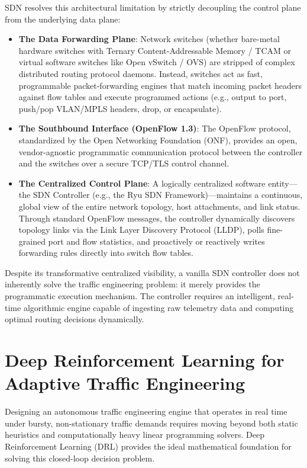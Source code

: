 SDN resolves this architectural limitation by strictly decoupling the control plane from the underlying data plane:
\begin{itemize}
    \item \textbf{The Data Forwarding Plane}: Network switches (whether bare-metal hardware switches with Ternary Content-Addressable Memory / TCAM or virtual software switches like Open vSwitch / OVS) are stripped of complex distributed routing protocol daemons. Instead, switches act as fast, programmable packet-forwarding engines that match incoming packet headers against flow tables and execute programmed actions (e.g., output to port, push/pop VLAN/MPLS headers, drop, or encapsulate).
    \item \textbf{The Southbound Interface (OpenFlow 1.3)}: The OpenFlow protocol, standardized by the Open Networking Foundation (ONF), provides an open, vendor-agnostic programmatic communication protocol between the controller and the switches over a secure TCP/TLS control channel.
    \item \textbf{The Centralized Control Plane}: A logically centralized software entity---the SDN Controller (e.g., the Ryu SDN Framework)---maintains a continuous, global view of the entire network topology, host attachments, and link status. Through standard OpenFlow messages, the controller dynamically discovers topology links via the Link Layer Discovery Protocol (LLDP), polls fine-grained port and flow statistics, and proactively or reactively writes forwarding rules directly into switch flow tables.
\end{itemize}

Despite its transformative centralized visibility, a vanilla SDN controller does not inherently solve the traffic engineering problem: it merely provides the programmatic execution mechanism. The controller requires an intelligent, real-time algorithmic engine capable of ingesting raw telemetry data and computing optimal routing decisions dynamically.

\section{Deep Reinforcement Learning for Adaptive Traffic Engineering}
Designing an autonomous traffic engineering engine that operates in real time under bursty, non-stationary traffic demands requires moving beyond both static heuristics and computationally heavy linear programming solvers. Deep Reinforcement Learning (DRL) provides the ideal mathematical foundation for solving this closed-loop decision problem.

